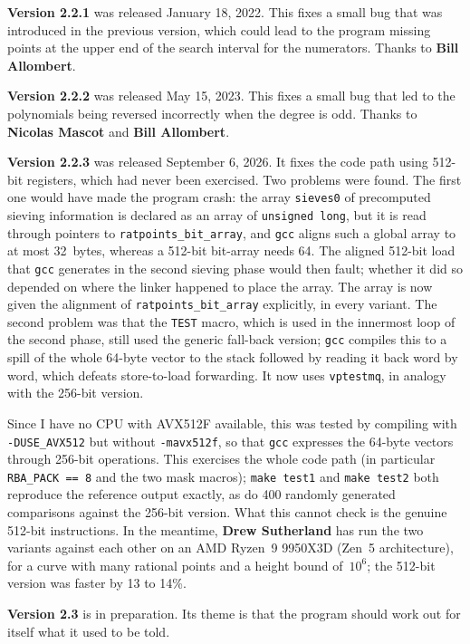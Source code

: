 \documentclass[12pt,a4paper,oneside]{amsart}
\begin{document}
\textbf{Version 2.2.1} was released January 18, 2022. This fixes a small
bug that was introduced in the previous version, which could lead to
the program missing points at the upper end of the search interval
for the numerators. Thanks to \textbf{Bill Allombert}.

\textbf{Version 2.2.2} was released May 15, 2023. This fixes a small
bug that led to the polynomials being reversed incorrectly when the
degree is odd. Thanks to \textbf{Nicolas Mascot} and \textbf{Bill Allombert}.

\textbf{Version 2.2.3} was released September 6, 2026. It fixes the code
path using 512-bit registers, which had never been exercised. Two problems
were found. The first one would have made
the program crash: the array \texttt{sieves0} of precomputed sieving
information is declared as an array of \texttt{unsigned long}, but it is
read through pointers to \texttt{ratpoints\_bit\_array}, and \texttt{gcc}
aligns such a global array to at most 32~bytes, whereas a 512-bit
bit-array needs 64. The aligned 512-bit load that \texttt{gcc} generates
in the second sieving phase would then fault; whether it did so depended
on where the linker happened to place the array. The array is now given
the alignment of \texttt{ratpoints\_bit\_array} explicitly, in every
variant. The second problem was that the \texttt{TEST} macro, which is
used in the innermost loop of the second phase, still used the generic
fall-back version; \texttt{gcc} compiles this to a spill of the whole
64-byte vector to the stack followed by reading it back word by word,
which defeats store-to-load forwarding. It now uses \texttt{vptestmq},
in analogy with the 256-bit version.

Since I have no CPU with AVX512F available, this was tested by compiling
with \verb+-DUSE_AVX512+ but without \verb+-mavx512f+, so that
\texttt{gcc} expresses the 64-byte vectors through 256-bit operations.
This exercises the whole code path (in particular \verb+RBA_PACK == 8+
and the two mask macros); \texttt{make test1} and \texttt{make test2}
both reproduce the reference output exactly, as do 400 randomly generated
comparisons against the 256-bit version. What this cannot check is the
genuine 512-bit instructions. In the meantime, \textbf{Drew Sutherland} has
run the two variants against each other on an AMD Ryzen~9 9950X3D (Zen~5
architecture), for a curve with many rational points and a height bound
of~$10^6$; the 512-bit version was faster by 13 to 14\%.

\textbf{Version 2.3} is in preparation. Its theme is that the program should
work out for itself what it used to be told.
\end{document}
